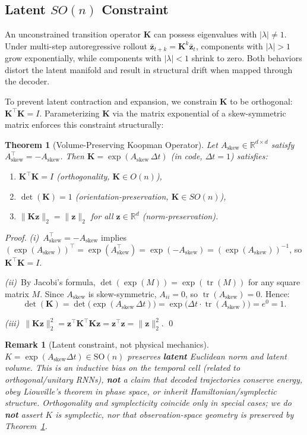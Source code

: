 \documentclass{article}
\newcommand{\K}{\mathbf{K}}
\newcommand{\z}{\mathbf{z}}
\newcommand{\Ask}{A_{\mathrm{skew}}}
\newcommand{\tr}{\operatorname{tr}}
\newcommand{\R}{\mathbb{R}}
\newtheorem{theorem}{Theorem}
\newtheorem{remark}{Remark}
\begin{document}
\subsection{Latent $SO(n)$ Constraint}
\label{sec:theory}

An unconstrained transition operator $\K$ can possess eigenvalues with $|\lambda| \neq 1$. Under multi-step autoregressive rollout $\bar{\z}_{t+k} = \K^k \bar{\z}_t$, components with $|\lambda| > 1$ grow exponentially, while components with $|\lambda| < 1$ shrink to zero. Both behaviors distort the latent manifold and result in structural drift when mapped through the decoder.

To prevent latent contraction and expansion, we constrain $\K$ to be orthogonal: $\K^\top\K = I$. Parameterizing $\K$ via the matrix exponential of a skew-symmetric matrix enforces this constraint structurally:

\begin{theorem}[Volume-Preserving Koopman Operator]
\label{thm:so_n}
Let $\Ask \in \R^{d \times d}$ satisfy $\Ask^{\top} = -\Ask$. Then $\K = \exp(\Ask\,\Delta t)$ (in code, $\Delta t=1$) satisfies:
\begin{enumerate}
  \item[(i)] $\K^{\top}\K = I$ \quad (orthogonality, $\K \in O(n)$),
  \item[(ii)] $\det(\K) = 1$ \quad (orientation-preservation, $\K \in SO(n)$),
  \item[(iii)] $\|\K\z\|_2 = \|\z\|_2$ for all $\z \in \R^d$ \quad (norm-preservation).
\end{enumerate}
\end{theorem}

\begin{proof}
\textit{(i)}\ $\Ask^{\top} = -\Ask$ implies
$(\exp(\Ask))^{\top} = \exp(\Ask^{\top}) = \exp(-\Ask) = (\exp(\Ask))^{-1}$,
so $\K^{\top}\K = I$.

\textit{(ii)}\ By Jacobi's formula, $\det(\exp(M)) = \exp(\tr(M))$ for any square matrix $M$. Since $\Ask$ is skew-symmetric, $A_{ii} = 0$, so $\tr(\Ask) = 0$. Hence:
\begin{equation}
  \det(\K) = \det\!\bigl(\exp(\Ask\,\Delta t)\bigr)
           = \exp\!\bigl(\Delta t\cdot\tr(\Ask)\bigr) = e^0 = 1.
\end{equation}

\textit{(iii)}\ $\|\K\z\|_2^2 = \z^{\top}\K^{\top}\K\z = \z^{\top}\z = \|\z\|_2^2$.
\qed
\end{proof}

\begin{remark}[Latent constraint, not physical mechanics]
\label{cor:liouville}
$K=\exp(A_{\mathrm{skew}}\Delta t)\in\mathrm{SO}(n)$ preserves \textbf{latent} Euclidean norm and latent volume. This is an inductive bias on the temporal cell (related to orthogonal/unitary RNNs), \textbf{not} a claim that decoded trajectories conserve energy, obey Liouville's theorem in phase space, or inherit Hamiltonian/symplectic structure. Orthogonality and symplecticity coincide only in special cases; we do \textbf{not} assert $K$ is symplectic, nor that observation-space geometry is preserved by Theorem~\ref{thm:so_n}.
\end{remark}
\end{document}
